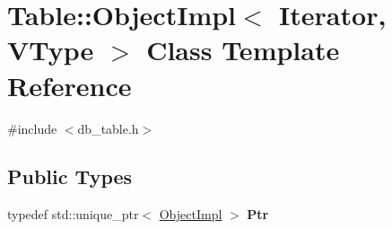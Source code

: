\hypertarget{class_table_1_1_object_impl}{}\section{Table\+:\+:Object\+Impl$<$ Iterator, V\+Type $>$ Class Template Reference}
\label{class_table_1_1_object_impl}


{\ttfamily \#include $<$db\+\_\+table.\+h$>$}

\subsection*{Public Types}
\begin{DoxyCompactItemize}
\item 
\mbox{\label{class_table_1_1_object_impl_a892fc764cb681fc422127e79d4ed63fe}} 
typedef std\+::unique\+\_\+ptr$<$ \hyperlink{class_table_1_1_object_impl}{Object\+Impl} $>$ {\bfseries Ptr}
\end{DoxyCompactItemize}
